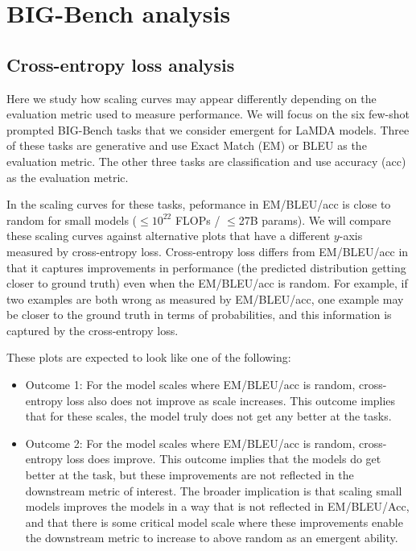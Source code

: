 \clearpage
\section{BIG-Bench analysis} \label{app:metric_dependence}

\subsection{Cross-entropy loss analysis}\label{subec:x_ent_analysis}

Here we study how scaling curves may appear differently depending on the evaluation metric used to measure performance.
We will focus on the six few-shot prompted BIG-Bench tasks that we consider emergent for LaMDA models.
Three of these tasks are generative and use Exact Match (EM) or BLEU \citep{papineni2002bleu} as the evaluation metric.
The other three tasks are classification and use accuracy (acc) as the evaluation metric.

In the scaling curves for these tasks, peformance in EM/BLEU/acc is close to random for small models (${\leq}10^{22}$ FLOPs / ${\leq}$27B params).
We will compare these scaling curves against alternative plots that have a different $y$-axis measured by cross-entropy loss.
Cross-entropy loss differs from EM/BLEU/acc in that it captures improvements in performance (the predicted distribution getting closer to ground truth) even when the EM/BLEU/acc is random.
For example, if two examples are both wrong as measured by EM/BLEU/acc, one example may be closer to the ground truth in terms of probabilities, and this information is captured by the cross-entropy loss.

These plots are expected to look like one of the following:
\begin{itemize}
    \item Outcome 1: For the model scales where EM/BLEU/acc is random, cross-entropy loss also does not improve as scale increases. This outcome implies that for these scales, the model truly does not get any better at the tasks.
    \item Outcome 2: For the model scales where EM/BLEU/acc is random, cross-entropy loss does improve. This outcome implies that the models do get better at the task, but these improvements are not reflected in the downstream metric of interest. The broader implication is that scaling small models improves the models in a way that is not reflected in EM/BLEU/Acc, and that there is some critical model scale where these improvements enable the downstream metric to increase to above random as an emergent ability.
\end{itemize}



